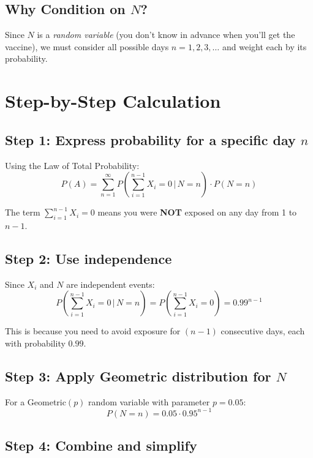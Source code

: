 \documentclass[11pt]{article}
\begin{document}
\subsection{Why Condition on $N$?}

Since $N$ is a \emph{random variable} (you don't know in advance when you'll get the vaccine), we must consider all possible days $n = 1, 2, 3, \ldots$ and weight each by its probability.

\section{Step-by-Step Calculation}

\subsection{Step 1: Express probability for a specific day $n$}

Using the Law of Total Probability:
\begin{equation}
P(A) = \sum_{n=1}^{\infty} P\left(\sum_{i=1}^{n-1} X_i = 0 \,\Big|\, N = n\right) \cdot P(N = n)
\end{equation}

The term $\sum_{i=1}^{n-1} X_i = 0$ means you were \textbf{NOT} exposed on any day from 1 to $n-1$.

\subsection{Step 2: Use independence}

Since $X_i$ and $N$ are independent events:
\begin{equation}
P\left(\sum_{i=1}^{n-1} X_i = 0 \,\Big|\, N = n\right) = P\left(\sum_{i=1}^{n-1} X_i = 0\right) = 0.99^{n-1}
\end{equation}

This is because you need to avoid exposure for $(n-1)$ consecutive days, each with probability $0.99$.

\subsection{Step 3: Apply Geometric distribution for $N$}

For a Geometric$(p)$ random variable with parameter $p = 0.05$:
\begin{equation}
P(N = n) = 0.05 \cdot 0.95^{n-1}
\end{equation}

\subsection{Step 4: Combine and simplify}
\end{document}
